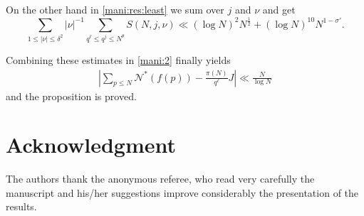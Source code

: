 \documentclass[a4paper,10pt]{amsart}
\numberwithin{equation}{section}
\theoremstyle{definition}
\theoremstyle{remark}
\renewcommand{\lvert}{\left\vert}
\renewcommand{\rvert}{\right\vert}
\begin{document}
On the other hand in \eqref{mani:res:least} we sum over $j$ and $\nu$ and get
\[
\sum_{1\leq\lvert\nu\rvert\leq\delta^2}\lvert\nu\rvert^{-1}
\sum_{q^\ell\leq q^j\leq N^\theta}S(N,j,\nu)
\ll(\log N)^2N^{\frac12}+(\log N)^{10}N^{1-\sigma'}.
\]

Combining these estimates in \eqref{mani:2} finally yields
\begin{align*}
\lvert\sum_{p\leq
  N}\mathcal{N}^*(f(p))-\frac{\pi(N)}{q^{\ell}}J\rvert\ll\frac{N}{\log N}
\end{align*}
and the proposition is proved.

\section*{Acknowledgment}
The authors thank the anonymous referee, who read very carefully the manuscript and his/her suggestions improve considerably the presentation of the results.
\end{document}
